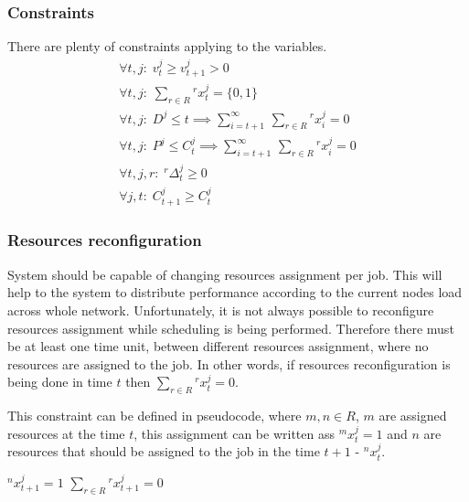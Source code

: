 \subsubsection{Constraints}
There are plenty of constraints applying to the variables.
\begin{align*}
	\forall t, j:\; v_{t}^{j} \geq v_{t+1}^{j} > 0                                                              \\     
	\forall t, j:\; \sum_{r \in R} {}^{r}x_{t}^{j} = \{0, 1\}                                                   \\
	\forall t, j:\; D^{j} \leq t \implies \sum_{i = t+1}^{\infty} \, \sum_{r \in R} {}^{r}x_{i}^{j} = 0         \\
	\forall t, j:\; P^{j} \leq C_{t}^{j} \implies \sum_{i = t+1}^{\infty} \, \sum_{r \in R} {}^{r}x_{i}^{j} = 0 \\
	\forall t, j, r:\; {}^{r}\Delta_{t}^{j} \geq 0                                                              \\
	\forall j, t:\; C_{t+1}^{j} \geq C_{t}^{j}                                                                  
\end{align*}

\subsubsection{Resources reconfiguration}
System should be capable of changing resources assignment per job.
This will help to the system to distribute performance according to the current nodes load across whole network.
Unfortunately, it is not always possible to reconfigure resources assignment while scheduling is being performed.
Therefore there must be at least one time unit, between different resources assignment,
where no resources are assigned to the job.
In other words, if resources reconfiguration is being done in time $t$ then $\sum_{r \in R} {}^{r}x_{t}^{j} = 0$.

This constraint can be defined in pseudocode,
where $m, n \in R$, $m$ are assigned resources at the time $t$,
this assignment can be written ass  ${}^{m}x_{t}^{j} = 1$
and $n$ are resources that should be assigned to the job in the time $t+1$ - ${}^{n}x_{t}^{j}$.

\begin{samepage}
	\begin{algorithmic}
		\STATE ${}^{n}x_{t+1}^{j} = 1$
		\ELSE
		\STATE $\sum_{r \in R} {}^{r}x_{t+1}^{j} = 0$
		\ENDIF 
		\ENDIF 
	\end{algorithmic}        
\end{samepage}

